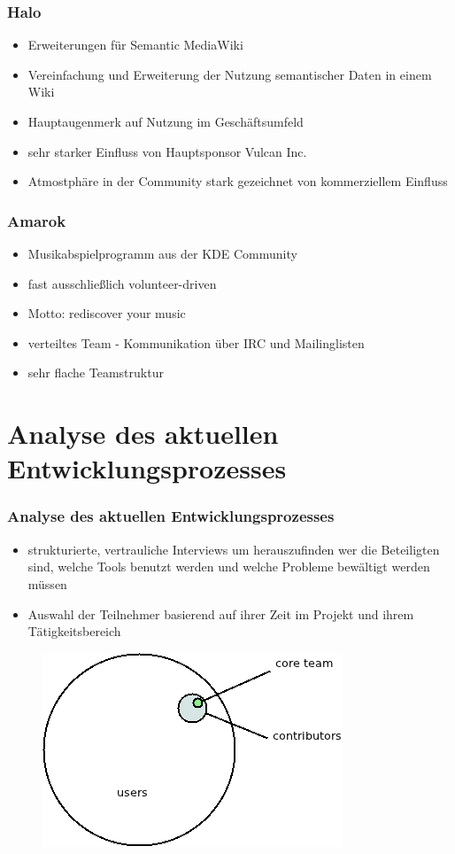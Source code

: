 \documentclass{beamer}
\begin{document}
\begin{frame}
\frametitle{Halo}
\begin{itemize}
 \item Erweiterungen f\"ur Semantic MediaWiki
 \item Vereinfachung und Erweiterung der Nutzung semantischer Daten in einem Wiki
 \item Hauptaugenmerk auf Nutzung im Gesch\"aftsumfeld
 \item sehr starker Einfluss von Hauptsponsor Vulcan Inc.
 \item Atmostph\"are in der Community stark gezeichnet von kommerziellem Einfluss
\end{itemize}
\end{frame}

\begin{frame}
\frametitle{Amarok}
\begin{itemize}
 \item Musikabspielprogramm aus der KDE Community
 \item fast ausschlie\ss lich volunteer-driven
 \item Motto: rediscover your music
 \item verteiltes Team - Kommunikation \"uber IRC und Mailinglisten
 \item sehr flache Teamstruktur
\end{itemize}
\end{frame}

\section{Analyse des aktuellen Entwicklungsprozesses}

\begin{frame}
\frametitle{Analyse des aktuellen Entwicklungsprozesses}
\begin{itemize}
 \item strukturierte, vertrauliche Interviews um herauszufinden wer die Beteiligten sind, welche Tools benutzt werden und welche Probleme bew\"altigt werden m\"ussen
 \item Auswahl der Teilnehmer basierend auf ihrer Zeit im Projekt und ihrem T\"atigkeitsbereich
\end{itemize}
\begin{figure}[h!]
 \centering
 \includegraphics[scale=0.35,keepaspectratio=true]{./communitymodel.png}
\end{figure}
\end{frame}
\end{document}
